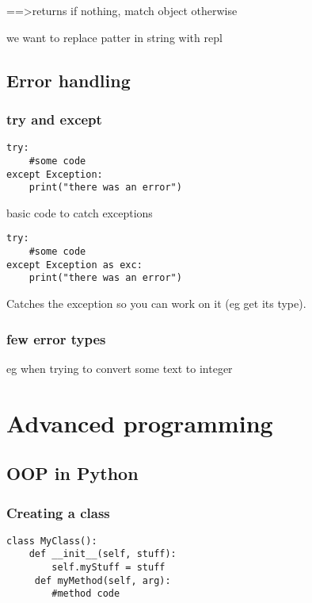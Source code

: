 
			 ==>returns  if nothing, match object otherwise

			 we want to replace patter in string with repl

	
	
	\subsection{Error handling}

		\subsubsection{try and except}


\begin{lstlisting}
try:
    #some code
except Exception:
    print("there was an error")
\end{lstlisting}

			basic code to catch exceptions


\begin{lstlisting}
try:
    #some code
except Exception as exc:
    print("there was an error")
\end{lstlisting}

			Catches the exception so you can work on it (eg get its type).

		\subsubsection{few error types}

			 eg when trying to convert some text to integer



\section{Advanced programming}

	\subsection{OOP in Python}

		\subsubsection{Creating a class}


\begin{lstlisting}
class MyClass():
    def __init__(self, stuff):
        self.myStuff = stuff
     def myMethod(self, arg):
     	#method code
\end{lstlisting}

